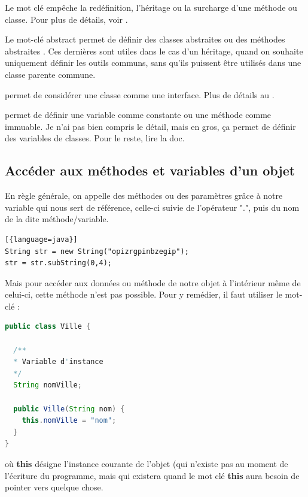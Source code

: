 \documentclass[a4paper,twoside]{article}
\begin{document}
\bigskip

Le mot clé  empêche la redéfinition, l'héritage ou la surcharge d'une méthode ou classe. Pour plus de détails, voir .

\bigskip

Le mot-clé abstract permet de définir des classes abstraites  ou des méthodes abstraites . Ces dernières sont utiles dans le cas d'un héritage, quand on souhaite uniquement définir les outils communs, sans qu'ils puissent être utilisés dans une classe parente commune.

\bigskip

 permet de considérer une classe comme une interface. Plus de détails au .

\bigskip

 permet de définir une variable comme constante ou une méthode comme immuable. Je n'ai pas bien compris le détail, mais en gros, ça permet de définir des variables de classes. Pour le reste, lire la doc. %

\subsection{Accéder aux méthodes et variables d'un objet}
En règle générale, on appelle des méthodes ou des paramètres grâce à notre variable qui nous sert de référence, celle-ci suivie de l'opérateur ".", puis du nom de la dite méthode/variable.
\begin{lstlisting}[{language=java}]
String str = new String("opizrgpinbzegip");
str = str.subString(0,4);
\end{lstlisting}

Mais pour accéder aux données ou méthode de notre objet à l'intérieur même de celui-ci, cette méthode n'est pas possible. Pour y remédier, il faut utiliser le mot-clé  :
\begin{lstlisting}[language=java]
public class Ville {
  
  /**
  * Variable d'instance
  */
  String nomVille;
  
  public Ville(String nom) {
    this.nomVille = "nom";
  }
}
\end{lstlisting}
où \textbf{this} désigne l'instance courante de l'objet (qui n'existe pas au moment de l'écriture du programme, mais qui existera quand le mot clé \textbf{this} aura besoin de pointer vers quelque chose. 
\end{document}
